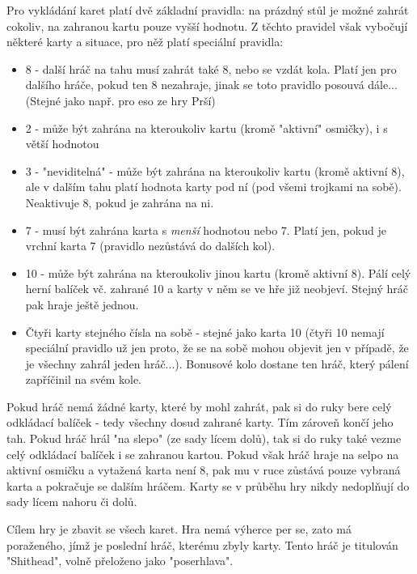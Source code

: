 \documentclass{article}
\begin{document}
Pro vykládání karet platí dvě základní pravidla: na prázdný stůl je možné zahrát cokoliv, na zahranou kartu pouze vyšší hodnotu. Z těchto pravidel však vybočují některé karty a situace, pro něž platí speciální pravidla:
\begin{itemize}
    \item 8 - další hráč na tahu musí zahrát také 8, nebo se vzdát kola. Platí jen pro dalšího hráče, pokud ten 8 nezahraje, jinak se toto pravidlo posouvá dále... (Stejné jako např. pro eso ze hry Prší)
    \item 2 - může být zahrána na kteroukoliv kartu (kromě "aktivní" osmičky), i s větší hodnotou
    \item 3 - "neviditelná" - může být zahrána na kteroukoliv kartu (kromě aktivní 8), ale v dalším tahu platí hodnota karty pod ní (pod všemi trojkami na sobě). Neaktivuje 8, pokud je zahrána na ni.
    \item 7 - musí být zahrána karta s \emph{menší} hodnotou nebo 7. Platí jen, pokud je vrchní karta 7 (pravidlo nezůstává do dalších kol).
    \item 10 - může být zahrána na kteroukoliv jinou kartu (kromě aktivní 8). Pálí celý herní balíček vč. zahrané 10 a karty v něm se ve hře již neobjeví. Stejný hráč pak hraje ještě jednou.
    \item Čtyři karty stejného čísla na sobě - stejné jako karta 10 (čtyři 10 nemají speciální pravidlo už jen proto, že se na sobě mohou objevit jen v případě, že je všechny zahrál jeden hráč...). Bonusové kolo dostane ten hráč, který pálení zapříčinil na svém kole.
\end{itemize}
Pokud hráč nemá žádné karty, které by mohl zahrát, pak si do ruky bere celý odkládací balíček - tedy všechny dosud zahrané karty. Tím zároveň končí jeho tah. Pokud hráč hrál "na slepo" (ze sady lícem dolů), tak si do ruky také vezme celý odkládací balíček i se zahranou kartou. Pokud však hráč hraje na selpo na aktivní osmičku a vytažená karta není 8, pak mu v ruce zůstává pouze vybraná karta a pokračuje se dalším hráčem. Karty se v průběhu hry nikdy nedoplňují do sady lícem nahoru či dolů.

Cílem hry je zbavit se všech karet. Hra nemá výherce per se, zato má poraženého, jímž je poslední hráč, kterému zbyly karty. Tento hráč je titulován "Shithead", volně přeloženo jako "poserhlava".
\end{document}
